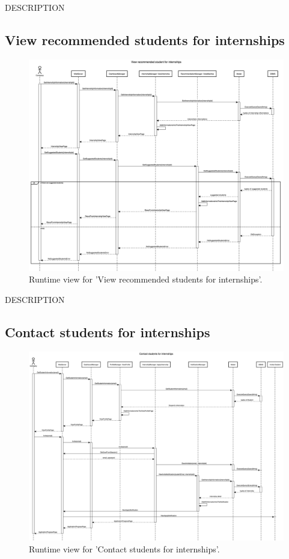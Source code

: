 DESCRIPTION


\subsection{View recommended students for internships}
\begin{figure}[H]
    \begin{center}
        \includegraphics[width=0.8\linewidth]{DD/LaTeX/Images/RuntimeView/ViewRecommendedStudenst.png}
        \caption{Runtime view for 'View recommended students for internships'.}
        \label{fig:runtime_ViewRecommendedStudenst}%
    \end{center}
\end{figure}

DESCRIPTION


\subsection{Contact students for internships}
\begin{figure}[H]
    \begin{center}
        \includegraphics[width=0.8\linewidth]{DD/LaTeX/Images/RuntimeView/ContactStudent.png}
        \caption{Runtime view for 'Contact students for internships'.}
        \label{fig:runtime_ContactStudent}%
    \end{center}
\end{figure}

